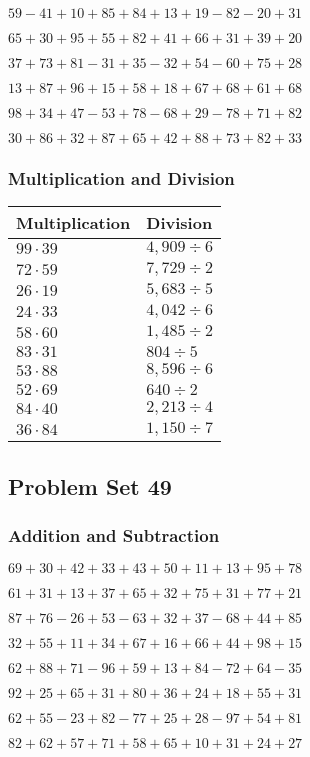 \(59-41+10+85+84+13+19-82-20+31\)

\(65+30+95+55+82+41+66+31+39+20\)

\(37+73+81-31+35-32+54-60+75+28\)

\(13+87+96+15+58+18+67+68+61+68\)

\(98+34+47-53+78-68+29-78+71+82\)

\(30+86+32+87+65+42+88+73+82+33\)

\hypertarget{multiplication-and-division-88}{%
\subsubsection{Multiplication and
Division}\label{multiplication-and-division-88}}

\begin{longtable}[]{@{}ll@{}}
\toprule
Multiplication & Division\tabularnewline
\midrule
\endhead
\(99\cdot39\) & \(4,909÷6\)\tabularnewline
\(72\cdot59\) & \(7,729÷2\)\tabularnewline
\(26\cdot19\) & \(5,683÷5\)\tabularnewline
\(24\cdot33\) & \(4,042÷6\)\tabularnewline
\(58\cdot60\) & \(1,485÷2\)\tabularnewline
\(83\cdot31\) & \(804÷5\)\tabularnewline
\(53\cdot88\) & \(8,596÷6\)\tabularnewline
\(52\cdot69\) & \(640÷2\)\tabularnewline
\(84\cdot40\) & \(2,213÷4\)\tabularnewline
\(36\cdot84\) & \(1,150÷7\)\tabularnewline
\bottomrule
\end{longtable}

\hypertarget{problem-set-49}{%
\subsection{Problem Set 49}\label{problem-set-49}}

\hypertarget{addition-and-subtraction-89}{%
\subsubsection{Addition and
Subtraction}\label{addition-and-subtraction-89}}

\(69+30+42+33+43+50+11+13+95+ 78\)

\(61+31+13+37+65+32+75+31+77+21\)

\(87+76-26+53-63+32+37-68+44+85\)

\(32+55+11+34+67+16+66+44+98+15\)

\(62+88+71-96+59+13+84-72+64-35\)

\(92+25+65+31+80+36+24+18+55+31\)

\(62+55-23+82-77+25+28-97+54+81\)

\(82+62+57+71+58+65+10+31+24+27\)

